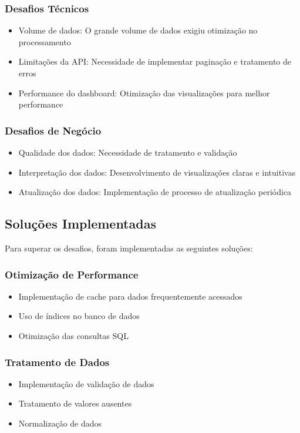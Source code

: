 \documentclass[12pt,a4paper]{article}
\begin{document}
\subsubsection{Desafios Técnicos}
\begin{itemize}
    \item Volume de dados: O grande volume de dados exigiu otimização no processamento
    \item Limitações da API: Necessidade de implementar paginação e tratamento de erros
    \item Performance do dashboard: Otimização das visualizações para melhor performance
\end{itemize}

\subsubsection{Desafios de Negócio}
\begin{itemize}
    \item Qualidade dos dados: Necessidade de tratamento e validação
    \item Interpretação dos dados: Desenvolvimento de visualizações claras e intuitivas
    \item Atualização dos dados: Implementação de processo de atualização periódica
\end{itemize}

\subsection{Soluções Implementadas}
Para superar os desafios, foram implementadas as seguintes soluções:

\subsubsection{Otimização de Performance}
\begin{itemize}
    \item Implementação de cache para dados frequentemente acessados
    \item Uso de índices no banco de dados
    \item Otimização das consultas SQL
\end{itemize}

\subsubsection{Tratamento de Dados}
\begin{itemize}
    \item Implementação de validação de dados
    \item Tratamento de valores ausentes
    \item Normalização de dados
\end{itemize}
\end{document}
